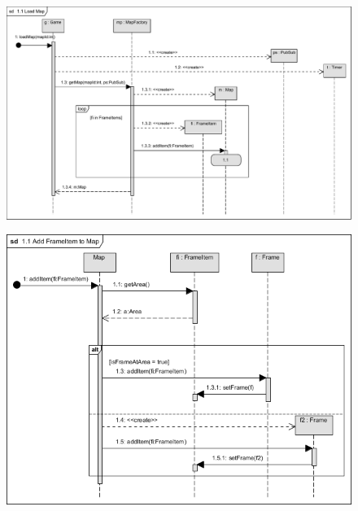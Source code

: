 		\begin{figure}[ht!]
			\begin{center}
				\includegraphics[scale=0.8]{resources/seq_1-0_newMap}
				\caption{}
			\end{center}
		\end{figure}
		
		\begin{figure}[ht!]
			\begin{center}
				\includegraphics[scale=0.8]{resources/seq_1-1_addFrameItemToMap.png}
				\caption{}
			\end{center}
		\end{figure}
		
